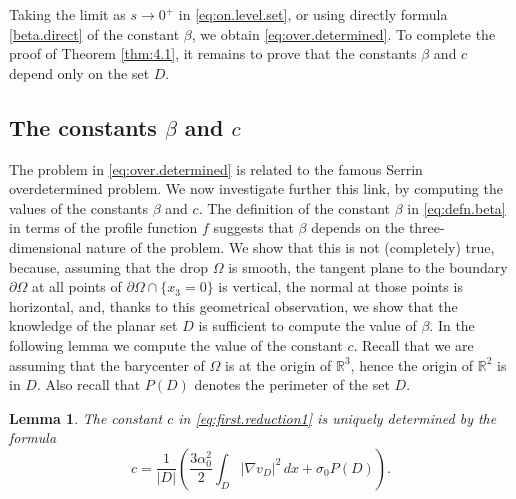 \documentclass[10pt,reqno,a4paper]{article}
\numberwithin{equation}{section}
\theoremstyle{plain}
\newtheorem{lemma}[theorem]{Lemma}
\theoremstyle{definition}
\newcommand{\R}{{\mathbb R}}
\newcommand{\Om}{\Omega}
\newcommand{\pa}{\partial}
\begin{document}
Taking the limit as $s \to 0^+$ in \eqref{eq:on.level.set}, 
or using directly formula \eqref{beta.direct} of the constant $\beta$,
we obtain \eqref{eq:over.determined}. 
To complete the proof of Theorem \ref{thm:4.1}, 
it remains to prove that the constants $\beta$ and $c$ depend only on the set $D$. 


\subsection{The constants $\beta$ and $c$}\label{sub:constant}
The problem in \eqref{eq:over.determined} is related to the famous Serrin overdetermined problem. We now investigate further this link, by computing the values of the constants $\beta$ and $c$.
The definition of the constant $\beta$ in \eqref{eq:defn.beta} in terms of the profile function $f$ 
suggests that $\beta$ depends on the three-dimensional nature of the problem.
We show that this is not (completely) true, because,  
assuming that the drop $\Omega$ is smooth, the tangent plane to the boundary $\pa \Om$ 
at all points of $\pa \Om \cap \{ x_3 = 0 \}$ is vertical, 
the normal at those points is horizontal, 
and, thanks to this geometrical observation,  
we show that the knowledge of the planar set $D$ is sufficient to compute the value of $\beta$.
In the following lemma we compute the value of the constant $c$.
Recall that we are assuming that the barycenter of $\Omega$ is at the origin of $\R^3$, 
hence the origin of $\R^2$ is in $D$.
Also recall that $P(D)$ denotes the perimeter of the set $D$. 

\begin{lemma}\label{lem:constant.c}
The constant $c$ in \eqref{eq:first.reduction1} is uniquely determined by the formula
\begin{equation}\label{eq:constant.c}
c=\frac{1}{|D|} \left(\frac{3\alpha^2_0}{2} \int_{D} |\nabla v_D|^2\,dx +\sigma_0 P(D)  \right).
\end{equation}
\end{lemma}
\end{document}
